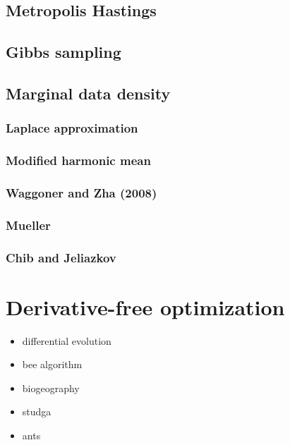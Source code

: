 \documentclass[letterpaper,10pt,english]{sphinxmanual}
\begin{document}
\section{Metropolis Hastings}
\label{mcmc:metropolis-hastings}

\section{Gibbs sampling}
\label{mcmc:gibbs-sampling}

\section{Marginal data density}
\label{mcmc:marginal-data-density}

\subsection{Laplace approximation}
\label{mcmc:laplace-approximation}

\subsection{Modified harmonic mean}
\label{mcmc:modified-harmonic-mean}

\subsection{Waggoner and Zha (2008)}
\label{mcmc:waggoner-and-zha-2008}

\subsection{Mueller}
\label{mcmc:mueller}

\subsection{Chib and Jeliazkov}
\label{mcmc:chib-and-jeliazkov}

\chapter{Derivative-free optimization}
\label{derivative_free_optimization:derivative-free-optimization}\label{derivative_free_optimization::doc}\begin{itemize}
\item {} 
differential evolution

\item {} 
bee algorithm

\item {} 
biogeography

\item {} 
studga

\item {} 
ants

\end{itemize}
\end{document}
